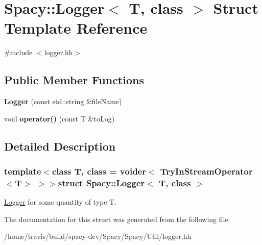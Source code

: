 \hypertarget{structSpacy_1_1Logger}{\section{\-Spacy\-:\-:\-Logger$<$ \-T, class $>$ \-Struct \-Template \-Reference}
\label{structSpacy_1_1Logger}
}


{\ttfamily \#include $<$logger.\-hh$>$}

\subsection*{\-Public \-Member \-Functions}
\begin{DoxyCompactItemize}
\item 
\hypertarget{structSpacy_1_1Logger_a689f95f10f159c8f4c3a841ffcdeaac8}{{\bfseries \-Logger} (const std\-::string \&file\-Name)}\label{structSpacy_1_1Logger_a689f95f10f159c8f4c3a841ffcdeaac8}

\item 
\hypertarget{structSpacy_1_1Logger_a4ee5bc204534bc4a3bd9b7e875c3a350}{void {\bfseries operator()} (const \-T \&to\-Log)}\label{structSpacy_1_1Logger_a4ee5bc204534bc4a3bd9b7e875c3a350}

\end{DoxyCompactItemize}


\subsection{\-Detailed \-Description}
\subsubsection*{template$<$class T, class = voider$<$ Try\-In\-Stream\-Operator$<$\-T$>$ $>$$>$struct Spacy\-::\-Logger$<$ T, class $>$}

\hyperlink{structSpacy_1_1Logger}{\-Logger} for some quantity of type \-T. 

\-The documentation for this struct was generated from the following file\-:\begin{DoxyCompactItemize}
\item 
/home/travis/build/spacy-\/dev/\-Spacy/\-Spacy/\-Util/logger.\-hh\end{DoxyCompactItemize}
